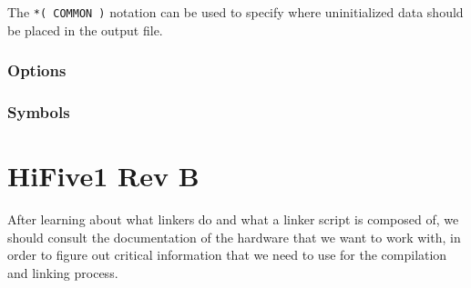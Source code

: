 \documentclass[a4paper,12pt,twoside]{report}
\begin{document}
                The \lstinline|*( COMMON )| notation can be used to specify where uninitialized data should be placed in the output file.\cite{gnuldOutputSections}

            \subsection{Options}

            \subsection{Symbols}

        \chapter{HiFive1 Rev B}
            After learning about what linkers do and what a linker script is composed of, we should consult the documentation of the hardware that we want to work with, in order to figure out critical information that we need to use for the compilation and linking process.
\end{document}
